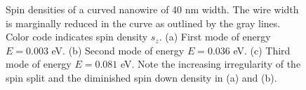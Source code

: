 \begin{figure}[h!]
\caption{Spin densities of a curved nanowire of 40 nm width. The wire width is marginally reduced in the curve as outlined by the gray lines. Color code indicates spin density $s_z$. (a) First mode of energy $E=0.003$ eV. (b) Second mode of energy $E=0.036$ eV. (c) Third mode of energy $E=0.081$ eV. Note the increasing irregularity of the spin split and the diminished spin down density in (a) and (b).}
\end{figure}
